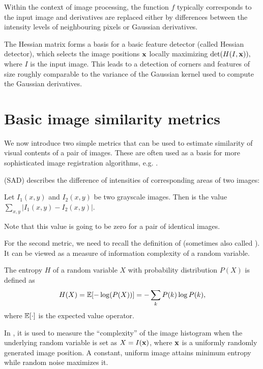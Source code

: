 Within the context of image processing, the function $f$ typically corresponds to the input image and derivatives are replaced either by differences between the intensity levels of neighbouring pixels or Gaussian derivatives. 

The Hessian matrix forms a basis for a basic feature detector (called Hessian detector), which selects the image positions $\mathbf{x}$ locally maximizing $\det(H(I, \mathbf{x})),$ where $I$ is the input image.
This leads to a detection of corners and features of size roughly comparable to the variance of the Gaussian kernel used to compute the Gaussian derivatives. %

\section{Basic image similarity metrics} %
\label{sec:metrics}

We now introduce two simple metrics that can be used to estimate similarity of visual contents of a pair of images. 
These are often used as a basis for more sophisticated image registration algorithms, e.g. \cite{hirschmuller2008}.

 (SAD) describes the difference of intensities of corresponding areas of two images: 
\begin{definition} 
Let $I_1(x, y)$ and $I_2(x, y)$ be two grayscale images. 
Then  is the value $\sum_{x, y} |I_1(x, y) - I_2(x, y)|$. 
\end{definition} 
Note that this value is going to be zero for a pair of identical images.

For the second metric, %
we need to recall the definition of  (sometimes also called ). 
It can be viewed as a measure of information complexity of a random variable. 
\begin{definition} 
The entropy $H$ of a random variable $X$ with probability distribution $P(X)$ is defined as %
\begin{align*}
  H(X) = \mathbb{E}[-\log(P(X))] = -\sum_k{P(k)\log P(k)},
\end{align*}
where $\mathbb{E}[\cdot]$ is the expected value operator.
\end{definition}
In \cv, it is used to measure the ``complexity'' of the image histogram when the underlying random variable is set as $X = I(\mathbf{x})$, where $\mathbf{x}$ is a uniformly randomly generated image position. 
A constant, uniform image attains minimum entropy while random noise maximizes it. 

